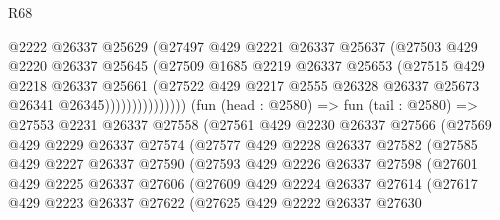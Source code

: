 \begin{lexlean}{R68}
\begin{coremodule}
                            @2222
                            @26337
                            @25629
                            (@27497
                              @429
                              @2221
                              @26337
                              @25637
                              (@27503
                                @429
                                @2220
                                @26337
                                @25645
                                (@27509
                                  @1685
                                  @2219
                                  @26337
                                  @25653
                                  (@27515
                                    @429
                                    @2218
                                    @26337
                                    @25661
                                    (@27522
                                      @429
                                      @2217
                                      @2555
                                      @26328
                                      @26337
                                      @25673
                                      @26341
                                      @26345)))))))))))))))
        (fun (head : @2580) =>
        fun (tail : @2580) =>
        @27553
          @2231
          @26337
          @27558
          (@27561
            @429
            @2230
            @26337
            @27566
            (@27569
              @429
              @2229
              @26337
              @27574
              (@27577
                @429
                @2228
                @26337
                @27582
                (@27585
                  @429
                  @2227
                  @26337
                  @27590
                  (@27593
                    @429
                    @2226
                    @26337
                    @27598
                    (@27601
                      @429
                      @2225
                      @26337
                      @27606
                      (@27609
                        @429
                        @2224
                        @26337
                        @27614
                        (@27617
                          @429
                          @2223
                          @26337
                          @27622
                          (@27625
                            @429
                            @2222
                            @26337
                            @27630

\end{coremodule}
\end{lexlean}
